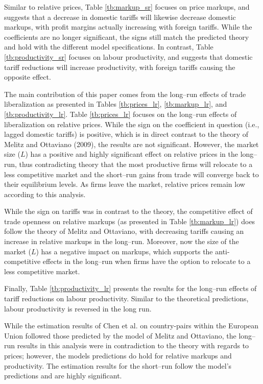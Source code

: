 Similar to relative prices, Table \ref{tb:markup_sr} focuses on price markups, and suggests that a decrease in domestic tariffs will likewise decrease domestic markups, with profit margins actually increasing with foreign tariffs. While the coefficients are no longer significant, the signs still match the predicted theory and hold with the different model specifications. In contrast, Table \ref{tb:productivity_sr} focuses on labour productivity, and suggests that domestic tariff reductions will increase productivity, with foreign tariffs causing the opposite effect.

The main contribution of this paper comes from the long--run effects of trade liberalization as presented in Tables \ref{tb:prices_lr}, \ref{tb:markup_lr}, and \ref{tb:productivity_lr}. Table \ref{tb:prices_lr} focuses on the long--run effects of liberalization on relative prices. While the sign on the coefficient in question (i.e., lagged domestic tariffs) is positive, which is in direct contrast to the theory of Melitz and Ottaviano (2009), the results are not significant. However, the market size ($L$) has a positive and highly significant effect on relative prices in the long--run, thus contradicting theory that the most productive firms will relocate to a less competitive market and the short--run gains from trade will converge back to their equilibrium levels. As firms leave the market, relative prices remain low according to this analysis.

While the sign on tariffs was in contrast to the theory, the competitive effect of trade openness on relative markups (as presented in Table \ref{tb:markup_lr}) does follow the theory of Melitz and Ottaviano, with decreasing tariffs causing an increase in relative markups in the long--run. Moreover, now the size of the market ($L$) has a negative impact on markups, which supports the anti-competitive effects in the long--run when firms have the option to relocate to a less competitive market. 

Finally, Table \ref{tb:productivity_lr} presents the results for the long--run effects of tariff reductions on labour productivity. Similar to the theoretical predictions, labour productivity is reversed in the long run.

While the estimation results of Chen et al. on country-pairs within the European Union followed those predicted by the model of Melitz and Ottaviano, the long--run results in this analysis were in contradiction to the theory with regards to prices; however, the models predictions do hold for relative markups and productivity. The estimation results for the short--run follow the model's predictions and are highly significant.


